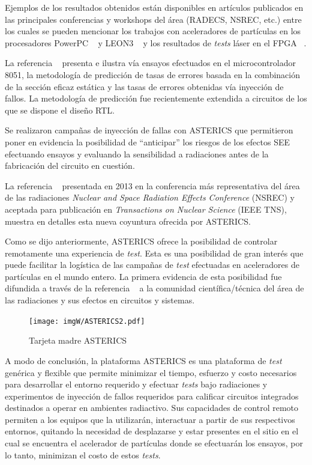 \documentclass[a4paper,openright,12pt]{report}
\begin{document}
Ejemplos de los resultados obtenidos están disponibles en artículos publicados en las principales conferencias y workshops del área (RADECS, NSREC, etc.) entre los cuales se pueden mencionar los trabajos con aceleradores de partículas en los procesadores  PowerPC ~\cite{4677290} y LEON3 ~\cite{1589184} y los resultados de \textit{tests} láser en el FPGA ~\cite{4567109}. 

La referencia ~\cite{960357} presenta e ilustra vía ensayos efectuados en el microcontrolador 8051, la metodología de predicción de tasas de errores basada en la combinación de la sección eficaz estática y las tasas de errores obtenidas vía inyección de fallos. La metodología de predicción fue recientemente extendida a circuitos de los que se dispone el diseño RTL.

Se realizaron campañas de inyección de fallas con ASTERICS que permitieron poner en evidencia la posibilidad de ``anticipar'' los riesgos de los efectos SEE efectuando ensayos y evaluando la sensibilidad a radiaciones antes de la fabricación del circuito en cuestión. 

La referencia ~\cite{6678236} presentada en 2013 en la conferencia  más representativa del área de las radiaciones \textit{Nuclear and Space Radiation Effects Conference} (NSREC) y aceptada para publicación en \textit{Transactions on Nuclear Science}  (IEEE TNS), muestra en detalles esta nueva coyuntura ofrecida por ASTERICS. 

Como se dijo anteriormente, ASTERICS ofrece la posibilidad de controlar  remotamente una experiencia de \textit{test}. Esta es una posibilidad de gran interés que puede facilitar la logística de las campañas de \textit{test} efectuadas en aceleradores de partículas en el mundo entero. La primera evidencia de esta posibilidad fue difundida a través de la referencia ~\cite{4638624} a la comunidad científica/técnica del área de las radiaciones y sus efectos en circuitos y sistemas.
 

\begin{figure}[H]
	\centering
	\texttt{[image: imgW/ASTERICS2.pdf]}
	\caption{Tarjeta madre ASTERICS}
	\label{ASTERICS1}
\end{figure}


A modo de conclusión, la plataforma ASTERICS es una plataforma de \textit{test} genérica y flexible que permite minimizar el tiempo, esfuerzo y costo necesarios para desarrollar el  entorno requerido y efectuar \textit{tests} bajo radiaciones y experimentos de inyección de fallos requeridos para calificar circuitos integrados destinados a operar en ambientes radiactivo. Sus capacidades de control remoto permiten a los equipos que la utilizarán,  interactuar a partir de sus respectivos entornos, quitando la necesidad de desplazarse y estar presentes en el sitio en el cual se encuentra el acelerador de partículas donde se efectuarán los ensayos,  por lo tanto, minimizan el costo de estos \textit{tests}.
\end{document}

